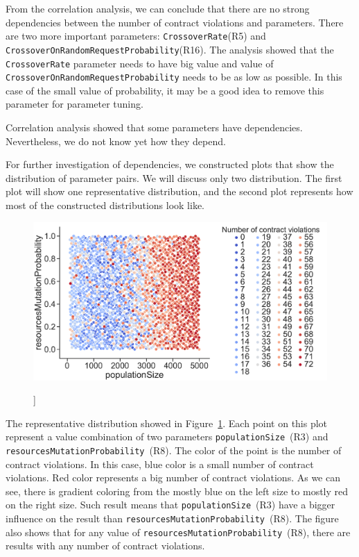 From the correlation analysis, we can conclude that there are no strong dependencies between the number of contract violations and parameters. There are two more important parameters: \texttt{CrossoverRate}(R5) and \texttt{CrossoverOnRandomRequestProbability}(R16).
The analysis showed that the \texttt{CrossoverRate} parameter needs to have big value and value of \texttt{CrossoverOnRandomRequestProbability} needs to be as low as possible. In this case of the small value of probability, it may be a good idea to remove this parameter for parameter tuning.

Correlation analysis showed that some parameters have dependencies. Nevertheless, we do not know yet how they depend.

For further investigation of dependencies, we constructed plots that show the distribution of parameter pairs. We will discuss only two distribution. The first plot will show one representative distribution, and the second plot represents how most of the constructed distributions look like.

\begin{figure}
	\centering
	\includegraphics[width=\textwidth]{images/populatioSizeVsResMutationProbability.pdf}
	\caption[]]{}
	\label{fig:populatioSizeVsResMutationProbability}
\end{figure}

The representative distribution showed in Figure~\ref{fig:populatioSizeVsResMutationProbability}. Each point on this plot represent a value combination of two parameters \texttt{populationSize}~(R3) and \texttt{resourcesMutationProbability}~(R8). The color of the point is the number of contract violations. In this case, blue color is a small number of contract violations. Red color represents a big number of contract violations. As we can see, there is gradient coloring from the mostly blue on the left size to mostly red on the right size. Such result means that \texttt{populationSize}~(R3) have a bigger influence on the result than \texttt{resourcesMutationProbability}~(R8). The figure also shows that for any value of \texttt{resourcesMutationProbability}~(R8), there are results with any number of contract violations.

